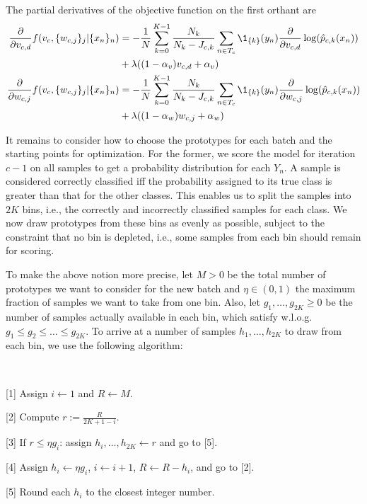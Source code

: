 %
The partial derivatives of the objective function on the first orthant are
%
\begin{align}
\frac{\partial}{\partial v_{c,d}}f(v_c,\{w_{c,j}\}_j|\{x_n\}_n)
&=-\frac{1}{N}\sum_{k=0}^{K-1}\frac{N_k}{N_k-J_{c,k}}\sum_{n\in T_c}
\1_{\{k\}}(y_n)\frac{\partial}{\partial v_{c,d}}\log(\hat{p}_{c,k}(x_n))
\label{eq_l_partial_v}\\
&+\lambda((1-\alpha_v)v_{c,d}+\alpha_v)\notag\\
\frac{\partial}{\partial w_{c,j}}f(v_c,\{w_{c,j}\}_j|\{x_n\}_n)
&=-\frac{1}{N}\sum_{k=0}^{K-1}\frac{N_k}{N_k-J_{c,k}}\sum_{n\in T_c}
\1_{\{k\}}(y_n)\frac{\partial}{\partial w_{c,j}}\log(\hat{p}_{c,k}(x_n))
\label{eq_l_partial_w}\\
&+\lambda((1-\alpha_w)w_{c,j}+\alpha_w)\notag
\end{align}
%
\begin{center}\end{center}
%
It remains to consider how to choose the prototypes for each batch and the starting points for optimization.
For the former, we score the model for iteration $c-1$ on all samples to get a probability distribution for each $Y_n$.
A sample is considered correctly classified iff the probability assigned to its true class is greater than that for the other classes.
This enables us to split the samples into $2K$ bins, i.e., the correctly and incorrectly classified samples for each class.
We now draw prototypes from these bins as evenly as possible, subject to the constraint that no bin is depleted, i.e., some samples from each bin should remain for scoring.\par
%
To make the above notion more precise, let $M>0$ be the total number of prototypes we want to consider for the new batch and $\eta\in(0,1)$ the  maximum fraction of samples we want to take from one bin.
Also, let $g_1,\dots, g_{2K}\geq0$ be the number of samples actually available in each bin, which satisfy w.l.o.g.\ $g_1\leq g_2\leq\dots\leq g_{2K}$.
To arrive at a number of samples $h_1,\dots,h_{2K}$ to draw from each bin, we use the following algorithm:
%
\begin{samepage}
\begin{algorithm}~
\label{alg_bins}
%
\begin{description}
\item{[1]} Assign $i\leftarrow1$ and $R\leftarrow M$.
%
\item{[2]} Compute $r:=\frac{R}{2K+1-i}$.
%
\item{[3]} If $r\leq\eta g_i$: assign $h_i,\dots,h_{2K}\leftarrow r$ and go to [5].
%
\item{[4]} Assign $h_i\leftarrow\eta g_i$, $i\leftarrow i+1$, $R\leftarrow R-h_i$, and go to [2].
%
\item{[5]} Round each $h_i$ to the closest integer number.
\end{description}
\end{algorithm}
\end{samepage}
